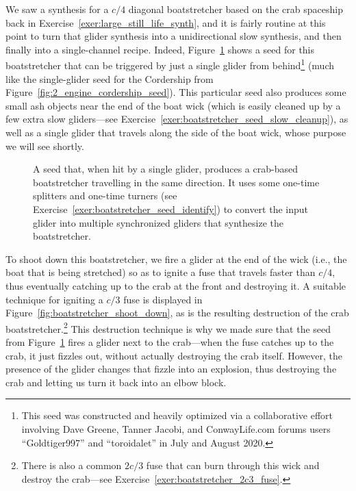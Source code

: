 We saw a synthesis for a $c/4$ diagonal boatstretcher based on the crab spaceship back in Exercise~\ref{exer:large_still_life_synth}, and it is fairly routine at this point to turn that glider synthesis into a unidirectional slow synthesis, and then finally into a single-channel recipe. Indeed, Figure~\ref{fig:boatstretcher_seed} shows a seed for this boatstretcher that can be triggered by just a single glider from behind\footnote{This seed was constructed and heavily optimized via a collaborative effort involving Dave Greene, Tanner Jacobi, and ConwayLife.com forums users ``Goldtiger997'' and ``toroidalet'' in July and August 2020.} (much like the single-glider seed for the Cordership from Figure~\ref{fig:2_engine_cordership_seed}). This particular seed also produces some small ash objects near the end of the boat wick (which is easily cleaned up by a few extra slow gliders---see Exercise~\ref{exer:boatstretcher_seed_slow_cleanup}), as well as a single glider that travels along the side of the boat wick, whose purpose we will see shortly.

\begin{figure}[!htb]
	\centering
	
	\caption{A seed that, when hit by a single glider, produces a crab-based boatstretcher travelling in the same direction. It uses some one-time splitters and one-time turners (see Exercise~\ref{exer:boatstretcher_seed_identify}) to convert the input glider into multiple synchronized gliders that synthesize the boatstretcher.}\label{fig:boatstretcher_seed}
\end{figure}

To shoot down this boatstretcher, we fire a glider at the end of the wick (i.e., the boat that is being stretched) so as to ignite a fuse that travels faster than $c/4$, thus eventually catching up to the crab at the front and destroying it. A suitable technique for igniting a $c/3$ fuse is displayed in Figure~\ref{fig:boatstretcher_shoot_down}, as is the resulting destruction of the crab boatstretcher.\footnote{There is also a common $2c/3$ fuse that can burn through this wick and destroy the crab---see Exercise~\ref{exer:boatstretcher_2c3_fuse}.} This destruction technique is why we made sure that the seed from Figure~\ref{fig:boatstretcher_seed} fires a glider next to the crab---when the fuse catches up to the crab, it just fizzles out, without actually destroying the crab itself. However, the presence of the glider changes that fizzle into an explosion, thus destroying the crab and letting us turn it back into an elbow block.

